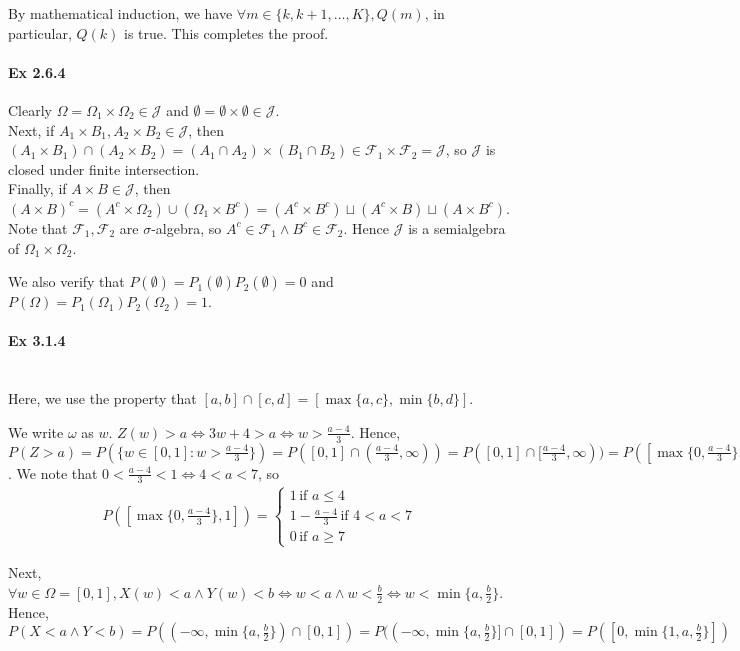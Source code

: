 \documentclass[a4paper]{article}
\newcommand{\semialg}[0]{\mathcal{J}} %
\begin{document}
By mathematical induction, we have $\forall m\in \{k,k+1,\dots,K\}, Q(m)$, in particular, $Q(k)$ is true. This completes the proof.


\paragraph{Ex 2.6.4} Clearly $\Omega = \Omega_1\times\Omega_2\in\semialg$ and $\emptyset=\emptyset\times\emptyset\in\semialg$.\\
Next, if $A_1\times B_1, A_2\times B_2\in\semialg$, then $(A_1\times B_1)\cap (A_2\times B_2) = (A_1\cap A_2)\times (B_1\cap B_2)\in \mathcal{F}_1\times\mathcal{F}_2 = \semialg$, so $\semialg$ is closed under finite intersection.\\
Finally, if $A\times B\in\semialg$, then $(A\times B)^c = (A^c\times \Omega_2)\cup (\Omega_1\times B^c) = (A^c\times B^c)\sqcup (A^c\times B)\sqcup (A\times B^c)$.\\
Note that $\mathcal{F}_1, \mathcal{F}_2$ are $\sigma$-algebra, so $A^c\in\mathcal{F}_1\land B^c\in\mathcal{F}_2$.
Hence $\semialg$ is a semialgebra of $\Omega_1\times\Omega_2$.

We also verify that $P(\emptyset) = P_1(\emptyset)P_2(\emptyset) = 0$ and $P(\Omega)=P_1(\Omega_1)P_2(\Omega_2) = 1$.

\paragraph{Ex 3.1.4}\mbox{}\\
Here, we use the property that $[a,b]\cap [c,d] = [\max\{a,c\},\min\{b,d\}]$.

We write $\omega$ as $w$. $Z(w) > a \iff 3w + 4 > a\iff w > \frac{a-4}{3}$. Hence, $P(Z > a) = P(\{w\in [0,1]:w>\frac{a-4}{3}\}) = P([0,1]\cap (\frac{a-4}{3}, \infty)) = P([0,1]\cap [\frac{a-4}{3},\infty)) = P([\max\{0,\frac{a-4}{3}\},1])$.
We note that $0 < \frac{a-4}{3} < 1\iff 4 < a < 7$, so
\begin{align*}
	P([\max\{0,\frac{a-4}{3}\},1]) = \begin{cases}
		1\, \text{if }a\leq 4\\
		1-\frac{a-4}{3}\, \text{if }4<a<7\\
		0\, \text{if }a\geq 7	
	\end{cases}
\end{align*}

Next, $\forall w\in \Omega = [0,1], X(w) < a\land Y(w) < b\iff w < a\land w < \frac{b}{2} \iff w < \min\{a,\frac{b}{2}\}$.
Hence, $P(X<a\land Y<b) = P((-\infty,\min\{a,\frac{b}{2}\})\cap [0,1]) = P((-\infty,\min\{a,\frac{b}{2}\}]\cap [0,1]) = P([0,\min\{1,a,\frac{b}{2}\}])$
\end{document}
